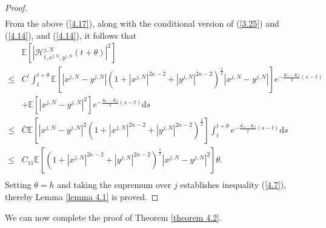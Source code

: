 \documentclass[12pt]{article}
\numberwithin{equation}{section}
\begin{document}
\begin{proof}
\begin{equation}
\begin{aligned}
\end{aligned}
\end{equation}
From the above  (\ref{4.17}), along with the conditional version of (\ref{3.25}) and (\ref{4.14}), and (\ref{4.14}), it follows that
\begin{equation}\tag{5.35}\label{4.18}
\begin{aligned}
&\mathbb{E} \left[ \left| \mathcal{H} _{t,x^{j,N},y^{j,N}}^{j,N}\left(t+\theta \right) \right|^2 \right]\\
\le& C^{\prime}\int_t^{t+\theta}{\mathbb{E} \left[ \left|x^{j,N}-y^{j,N}\right|\left( 1+\left|x^{j,N}\right|^{2\kappa -2}+\left|y^{j,N}\right|^{2\kappa -2} \right) ^{\frac{1}{2}}\left|x^{j,N}-y^{j,N}\right| \right] e^{ -\frac{K_1-K_2}{2}\left( s-t \right) }}\\
&+\mathbb{E} \left[ \left|x^{j,N}-y^{j,N}\right|^2 \right] e^{ -\frac{K_1-K_2}{2}\left( s-t \right) }\mathrm{d}s\\
\le& \bar{C}\mathbb{E} \left[ \left|x^{j,N}-y^{j,N}\right|^2\left( 1+\left|x^{j,N}\right|^{2\kappa -2}+\left|y^{j,N}\right|^{2\kappa -2} \right) ^{\frac{1}{2}} \right] \int_t^{t+\theta}{e^{ -\frac{K_1-K_2}{2}\left( s-t \right) }}\mathrm{d}s\\
\le& C_{11}\mathbb{E} \left[ \left( 1+\left| x^{j,N} \right|^{2\kappa -2}+\left| y^{j,N} \right|^{2\kappa -2} \right) ^{\frac{1}{2}}\left| x^{j,N}-y^{j,N} \right|^2 \right] \theta.\\
\end{aligned}
\end{equation}
Setting $\theta=h$ and taking the supremum over $j$  establishes inequality (\ref{4.7}),
thereby Lemma \ref{lemma 4.1} is proved.  
\end{proof} 
We can now complete the proof of Theorem \ref{theorem 4.2}.
\end{document}
